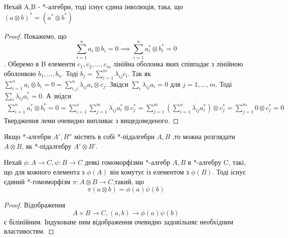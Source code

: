 \begin{lemma}
    Нехай A,B - *-алгебри, тоді існує єдина інволюція, така, що $(a \otimes b)^* = (a^* \otimes b^*)$
    \begin{proof}
        Покажемо, що
        \begin{equation*}
            \sum_{i=1}^n a_i \otimes b_i = 0 \implies \sum_{i=1}^n a_i^* \otimes b_i^* = 0
        \end{equation*}.
        Оберемо в B елементи $c_1, c_2, \dots, c_m$ лінійна оболонка яких співпадає з лінійною оболонкою $b_1, \dots, b_n$.
        Тоді $b_j = \sum_{i=1}^m \lambda_{ij}c_i$.
        Так як $\sum_{i=1}^n a_i \otimes b_i = 0 = \sum_{i,j}^n \lambda_{ij} a_i \otimes c_j$.
        Звідси $\sum_i \lambda_{ij} a_i = 0$ для $j = 1,\dots, m$.
        Тоді $\sum_i \overline{\lambda_{ij}}a_i^* = 0$.
        А звідси
        \begin{multline*}
            \sum_{i=1}^n a_i^* \otimes b_i^* = 0 =
            \sum_{i=1}^n \sum_{j=1}^m \overline{\lambda_{ij}} a_i^* \otimes c_j^* =
            \sum_{j=1}^m (\sum_{i=1}^n  \overline{\lambda_{ij}} a_i^*) \otimes c_j^* =
            \sum_{j=1}^m 0 \otimes c_j^* =
            0
        \end{multline*}
        Твердження леми очевидно випливає з вищедоведеного.
    \end{proof}
\end{lemma}

Якщо *-алгебри $A', B''$ містять в собі *-підалгебри $A,B$ ,то можна розглядати $A \otimes B$, як *-підалгебру $A' \otimes B'$.

\begin{remark}
    Нехай $\phi: A \to C, \psi: B \to C$ деякі гомоморфізми *-алгебр $A,B$ в *-алгебру C, такі,
    що для кожного елемента з $\phi(A)$ він комутує із елементом з $\phi(B)$.
    Тоді існує єдиний *-гомоморфізм $\pi: A \otimes B \to C$,такий, що
    \begin{equation*}
        \pi(a \otimes b) = \phi(a)\psi(b)
    \end{equation*}
    \begin{proof}
        Відображення
        \begin{equation*}
            A \times B \to C, (a,b) \to \phi(a)\psi(b)
        \end{equation*}
        є білінійним.
        Індуковане ним відображення очевидно задовільняє необхідним властивостям.
    \end{proof}
\end{remark}

